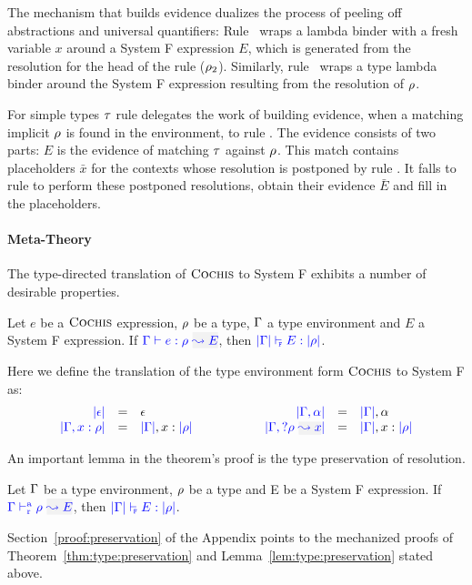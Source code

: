 The mechanism that builds evidence dualizes the process of peeling off
abstractions and universal quantifiers: Rule ~wraps a lambda
binder with a fresh variable $x$ around a System F expression $E$, which is
generated from the resolution for the head of the rule ($\rulet_2$). Similarly,
rule ~wraps a type lambda binder around the System F expression
resulting from the resolution of $\rulet$.

For simple types $\type$ rule  delegates the work of
building evidence, when a matching implicit $\rulet$ is found in the
environment, to rule . The evidence consists of two parts:
$E$ is the evidence of matching $\type$ against $\rulet$. This match contains
placeholders $\bar{x}$ for the contexts whose resolution is postponed by rule
. It falls to rule  to perform these
postponed resolutions, obtain their evidence $\bar{E}$ and fill in the
placeholders.

\paragraph{Meta-Theory} The type-directed translation of $\name$ to System F exhibits a number
of desirable properties.

\begin{theorem}\label{thm:type:preservation} Let $e$ be a $\name$
  expression, $\rulet$ be a type, $\tenv$ a type environment and $E$ a System F expression. If
  $\wte{\tenv}{e}{\rulet}{E}$, then $\fwte{\etrans{\tenv}}{E}{\ttrans[\rulet]}$.
\end{theorem}
Here we define the translation of the type environment form $\name$ to System F as:
\begin{equation*}
\begin{array}{rcl@{\hspace{2cm}}rcl}
\etrans{\epsilon} & = & \epsilon & \etrans{\tenv,\alpha} & = & \etrans{\tenv}, \alpha \\
\etrans{\tenv,x : \rulet} & = & \etrans{\tenv}, x : \ttrans[\rulet] &
\etrans{\tenv, \envi{\rulet}{x}} & = & \etrans{\tenv}, x : \ttrans[\rulet]
\end{array}
\end{equation*}

An important lemma in the theorem's proof is the type preservation of 
resolution.
\begin{lemma}\label{lem:type:preservation}
Let $\tenv$ be a type environment, $\rulet$ be a type and E be a System F expression.
If $\ares{\tenv}{\rulet}{E}$, then $\fwte{\etrans{\tenv}}{E}{\ttrans[\rulet]}$.
\end{lemma}
Section~\ref{proof:preservation} of the Appendix points to the mechanized proofs
of Theorem~\ref{thm:type:preservation} and Lemma~\ref{lem:type:preservation} stated above.

